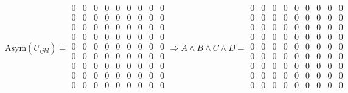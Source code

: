 \documentclass{article}
\begin{document}
$$\text{Asym}(U_{ijkl}) = \begin{array}{||ccc|ccc|ccc||}
0 & 0 & 0 & 0 & 0 & 0 & 0 & 0 & 0 \\
0 & 0 & 0 & 0 & 0 & 0 & 0 & 0 & 0 \\
0 & 0 & 0 & 0 & 0 & 0 & 0 & 0 & 0 \\
\hline
0 & 0 & 0 & 0 & 0 & 0 & 0 & 0 & 0 \\
0 & 0 & 0 & 0 & 0 & 0 & 0 & 0 & 0 \\
0 & 0 & 0 & 0 & 0 & 0 & 0 & 0 & 0 \\
\hline
0 & 0 & 0 & 0 & 0 & 0 & 0 & 0 & 0 \\
0 & 0 & 0 & 0 & 0 & 0 & 0 & 0 & 0 \\
0 & 0 & 0 & 0 & 0 & 0 & 0 & 0 & 0 \\
\end{array} \Rightarrow A \wedge B \wedge C \wedge D = \begin{array}{||ccc|ccc|ccc||}
0 & 0 & 0 & 0 & 0 & 0 & 0 & 0 & 0 \\
0 & 0 & 0 & 0 & 0 & 0 & 0 & 0 & 0 \\
0 & 0 & 0 & 0 & 0 & 0 & 0 & 0 & 0 \\
\hline
0 & 0 & 0 & 0 & 0 & 0 & 0 & 0 & 0 \\
0 & 0 & 0 & 0 & 0 & 0 & 0 & 0 & 0 \\
0 & 0 & 0 & 0 & 0 & 0 & 0 & 0 & 0 \\
\hline
0 & 0 & 0 & 0 & 0 & 0 & 0 & 0 & 0 \\
0 & 0 & 0 & 0 & 0 & 0 & 0 & 0 & 0 \\
0 & 0 & 0 & 0 & 0 & 0 & 0 & 0 & 0 \\
\end{array}$$
\end{document}
